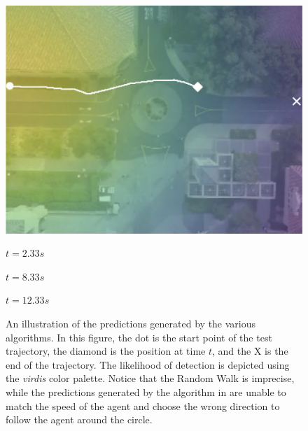 \documentclass[letterpaper,10pt,conference]{ieeeconf}
\begin{document}
\begin{figure}
\begin{minipage}[c]{0.3\linewidth}
		\includegraphics[width=\linewidth]{./figures/comparison/rand_death_1_2_t=370.jpg}
	\end{minipage}
	
	\vspace{0.2cm}
	\hspace{.5cm}
	\begin{minipage}{0.3\linewidth}
		\centering
		$t = 2.33s$
	\end{minipage}
	\begin{minipage}{0.3\linewidth}
		\centering
		$t = 8.33s$
	\end{minipage}
	\begin{minipage}{0.3\linewidth}
		\centering
		$t = 12.33s$
	\end{minipage}
	
	\caption{An illustration of the predictions generated by the various algorithms. In this figure, the dot is the start point of the test trajectory, the diamond is the position at time $t$, and the X is the end of the trajectory. The likelihood of detection is depicted using the \textit{virdis} color palette. Notice that the Random Walk is imprecise, while the predictions generated by the algorithm in \cite{Kitani2012} are unable to match the speed of the agent and choose the wrong direction to follow the agent around the circle.}
	
	\label{fig:death-1-2}
\end{figure}

\end{document}
